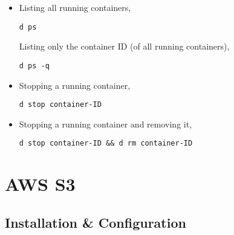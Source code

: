 \documentclass[12pt, a4paper]{scrbook}
\numberwithin{equation}{section}
\theoremstyle{definition}
\theoremstyle{definition}
\begin{document}
	\begin{itemize} 
		
		\item Listing all running containers, 
		
		\begin{lstlisting}[style=mystylebash, label=alg:docker__check_all_contain, xleftmargin=\parindent]
			d ps
		\end{lstlisting}
		
		Listing only the container ID (of all running containers),
		
		\begin{lstlisting}[style=mystylebash, label=alg:docker__contains_ids, xleftmargin=\parindent]
			d ps -q
		\end{lstlisting}
		
		\item Stopping a running container,
		
		\begin{lstlisting}[style=mystylebash, label=alg:docker__stop_contain, xleftmargin=\parindent]
			d stop container-ID
		\end{lstlisting}
		
		\item Stopping a running container and removing it,
		
		\begin{lstlisting}[style=mystylebash, label=alg:docker__stop_rem_contain, xleftmargin=\parindent]
			d stop container-ID && d rm container-ID
		\end{lstlisting}
		
	\end{itemize}
	
		\chapter{AWS S3} 
	
	\section{Installation \& Configuration}
	
\end{document}
